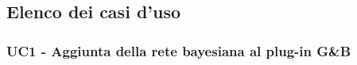 \subsection{Elenco dei casi d'uso}


\subsubsection{UC1 - Aggiunta della rete bayesiana al plug-in G\&B}\label{UC1}

